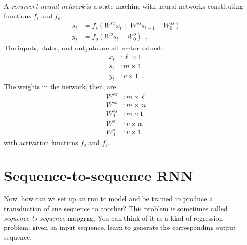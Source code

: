 A {\it recurrent neural network} is a state machine with neural
networks constituting functions $f_s$ and $f_o$:
\begin{align}
  s_t & = f_s\left(W^{sx}x_t + W^{ss}s_{t - 1} + W^{ss}_0\right) \\
  y_t & = f_o\left(W^o s_t + W_0^o\right) \;\;.
\end{align}
The inputs, states, and outputs are all vector-valued:
\begin{align}
x_t &: \ell \times 1 \\
s_t &: m \times 1 \\
y_t &: v \times 1 \;\;.
\end{align}
The weights in the network,  then,  are
\begin{align}
W^{sx} &:  m \times \ell \\
W^{ss} &: m \times m \\
W^{ss}_0 &: m \times 1 \\
W^{o} &: v \times m \\
W^{o}_0 &: v \times 1 
\end{align}
with activation functions $f_s$  and $f_o$.  


\section{Sequence-to-sequence RNN}

\label{sec:seq2seq_rnn}

Now, how can we set up an {\sc rnn} to model and be trained to produce
a transduction of one sequence to another?  This problem is sometimes
called {\em sequence-to-sequence} mapgrng.  You can think of it as a
kind of regression problem: given an input sequence, learn to generate
the corresponding output sequence. 

